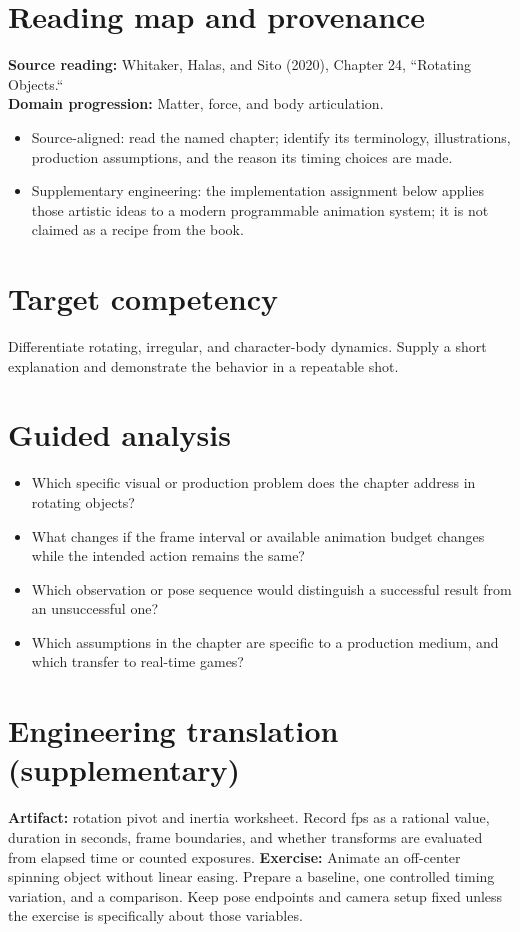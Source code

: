 \documentclass[10pt,letterpaper]{article}
\begin{document}
\makedoctitle
\makedocsummary

\section{Reading map and provenance}
\textbf{Source reading:} Whitaker, Halas, and Sito (2020), Chapter 24, ``Rotating Objects.``\\
\textbf{Domain progression:} Matter, force, and body articulation.
\begin{itemize}
\item Source-aligned: read the named chapter; identify its terminology, illustrations, production assumptions, and the reason its timing choices are made.
\item Supplementary engineering: the implementation assignment below applies those artistic ideas to a modern programmable animation system; it is not claimed as a recipe from the book.
\end{itemize}
\section{Target competency}
Differentiate rotating, irregular, and character-body dynamics. Supply a short explanation and demonstrate the behavior in a repeatable shot.
\section{Guided analysis}
\begin{itemize}
\item Which specific visual or production problem does the chapter address in rotating objects?
\item What changes if the frame interval or available animation budget changes while the intended action remains the same?
\item Which observation or pose sequence would distinguish a successful result from an unsuccessful one?
\item Which assumptions in the chapter are specific to a production medium, and which transfer to real-time games?
\end{itemize}
\section{Engineering translation (supplementary)}
\textbf{Artifact:} rotation pivot and inertia worksheet. Record fps as a rational value, duration in seconds, frame boundaries, and whether transforms are evaluated from elapsed time or counted exposures.
\textbf{Exercise:} Animate an off-center spinning object without linear easing. Prepare a baseline, one controlled timing variation, and a comparison. Keep pose endpoints and camera setup fixed unless the exercise is specifically about those variables.
\end{document}
